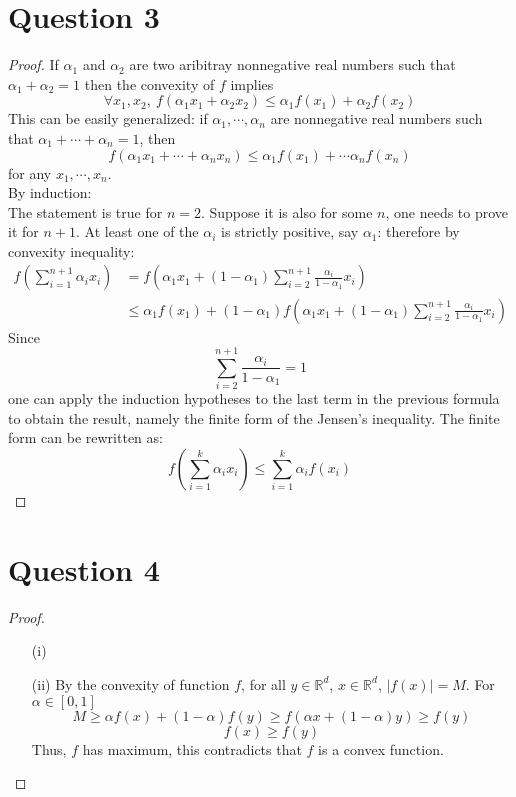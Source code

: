\documentclass{article}
\begin{document}
\section*{Question 3}
    \begin{proof}
        If $\alpha_1$ and $\alpha_2$ are two aribitray nonnegative real numbers such that $\alpha_1+\alpha_2=1$ then
        the convexity of $f$ implies
        $$ \forall x_1, x_2, \ f(\alpha_1 x_1 + \alpha_2 x_2) \leqslant \alpha_1 f(x_1) + \alpha_2 f(x_2) $$
        This can be easily generalized: if $\alpha_1, \cdots, \alpha_n$ are nonnegative real numbers such that
        $\alpha_1 + \cdots + \alpha_n = 1$, then
        $$f(\alpha_1 x_1 + \cdots + \alpha_n x_n) \leqslant \alpha_1 f(x_1) + \cdots \alpha_n f(x_n)$$
        for any $x_1, \cdots, x_n$.\\
        By induction:\\
        The statement is true for $n=2$. Suppose it is also for some $n$, one needs to prove it for $n+1$.
        At least one of the $\alpha_i$ is strictly positive, say $\alpha_1$: therefore by convexity inequality:
        \begin{align*}
            f\left(\sum_{i=1}^{n+1}\alpha_i x_i\right) &= f\left(\alpha_1 x_1 + (1-\alpha_1)\sum_{i=2}^{n+1}\frac{\alpha_i}{1-\alpha_1}x_i\right)\\
            &\leqslant \alpha_1 f(x_1) + (1-\alpha_1) f\left(\alpha_1 x_1 + (1-\alpha_1)\sum_{i=2}^{n+1}\frac{\alpha_i}{1-\alpha_1}x_i\right)
        \end{align*}
        Since $$ \sum_{i=2}^{n+1}\frac{\alpha_i}{1-\alpha_1} = 1 $$
        one can apply the induction hypotheses to the last term in the previous formula to obtain the result, namely the finite form of the Jensen's inequality.
        The finite form can be rewritten as:
        $$f\left(\sum_{i=1}^k \alpha_i x_i\right) \leqslant \sum_{i=1}^k \alpha_i f(x_i)$$
    \end{proof}

\section*{Question 4}
    \begin{proof}
        \indent
        \begin{itemize}
            \item[(i)]
            
            \item[{(ii)}]
            By the convexity of function $f$, for all $y \in \mathbb{R}^d$, $x \in \mathbb{R}^d$, $|f(x)| = M$. For $\alpha \in [0,1]$
            $$M \geqslant \alpha f(x) + (1-\alpha)f(y) \geqslant f\left(\alpha x + (1-\alpha) y\right)\geqslant f(y)$$
            $$f(x)\geqslant f(y)$$
            Thus, $f$ has maximum, this contradicts that $f$ is a convex function.
        \end{itemize}

    \end{proof}
\end{document}
